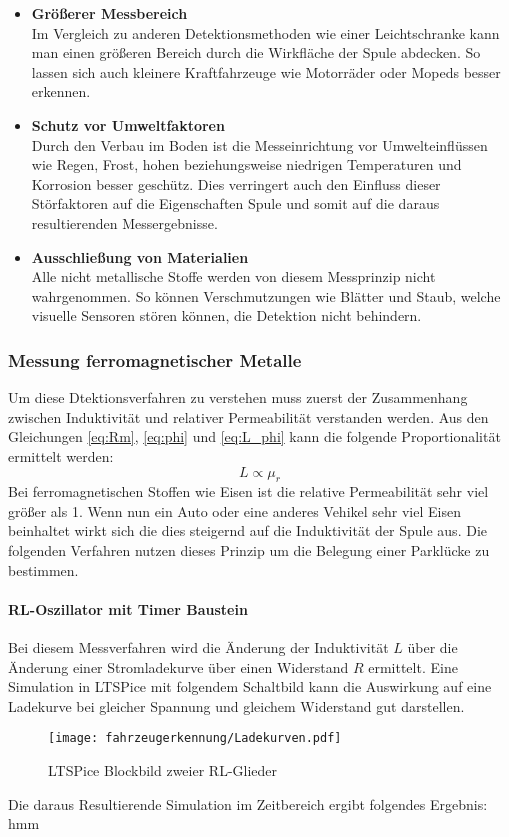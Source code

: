 \begin{itemize}
    \item \textbf{Größerer Messbereich} \\
    Im Vergleich zu anderen Detektionsmethoden wie einer Leichtschranke kann man einen größeren Bereich durch die Wirkfläche
    der Spule abdecken. So lassen sich auch kleinere Kraftfahrzeuge wie Motorräder oder Mopeds besser erkennen.
    \item \textbf{Schutz vor Umweltfaktoren} \\
    Durch den Verbau im Boden ist die Messeinrichtung vor Umwelteinflüssen wie Regen, Frost, hohen beziehungsweise
    niedrigen Temperaturen und Korrosion besser geschütz. Dies verringert auch den Einfluss dieser Störfaktoren auf die Eigenschaften
    Spule und somit auf die daraus resultierenden Messergebnisse.
    \item \textbf{Ausschließung von Materialien} \\
    Alle nicht metallische Stoffe werden von diesem Messprinzip nicht wahrgenommen. So können Verschmutzungen wie Blätter und Staub, welche
    visuelle Sensoren stören können, die Detektion nicht behindern.
    
\end{itemize}
\subsubsection{Messung ferromagnetischer Metalle}
Um diese Dtektionsverfahren zu verstehen muss zuerst der Zusammenhang zwischen Induktivität und relativer Permeabilität verstanden werden.
Aus den Gleichungen \ref{eq:Rm}, \ref{eq:phi} und \ref{eq:L_phi} kann die folgende Proportionalität ermittelt werden:
\begin{equation} \label{iq:L_mu}
    L \propto \mu_{r}
\end{equation}
Bei ferromagnetischen Stoffen wie Eisen ist die relative Permeabilität sehr viel größer als 1. Wenn nun ein Auto oder 
eine anderes Vehikel sehr viel Eisen beinhaltet wirkt sich die dies steigernd auf die Induktivität der Spule aus. Die folgenden
Verfahren nutzen dieses Prinzip um die Belegung einer Parklücke zu bestimmen.

\paragraph{RL-Oszillator mit Timer Baustein}\mbox{}
Bei diesem Messverfahren wird die Änderung der Induktivität $L$ über die Änderung einer Stromladekurve über einen Widerstand
$R$ ermittelt. Eine Simulation in LTSPice mit folgendem Schaltbild kann die Auswirkung auf eine Ladekurve bei gleicher Spannung
und gleichem Widerstand gut darstellen.
\begin{figure}[H]
    \centering
    \texttt{[image: fahrzeugerkennung/Ladekurven.pdf]}
    \caption{LTSPice Blockbild zweier RL-Glieder}
\end{figure}
\pagebreak
Die daraus Resultierende Simulation im Zeitbereich ergibt folgendes Ergebnis:
hmm


